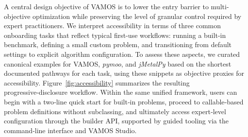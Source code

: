 \documentclass[final,5p,times,twocolumn]{elsarticle}
\newcommand{\VAMOS}{VAMOS}
\begin{document}
A central design objective of \VAMOS{} is to lower the entry barrier to multi-objective optimization while preserving the level of granular control required by expert practitioners. We interpret accessibility in terms of three common onboarding tasks that reflect typical first-use workflows: running a built‑in benchmark, defining a small custom problem, and transitioning from default settings to explicit algorithm configuration. To assess these aspects, we curated canonical examples for \VAMOS{}, \textit{pymoo}, and \textit{jMetalPy} based on the shortest documented pathways for each task, using these snippets as objective proxies for accessibility. Figure~\ref{fig:accessibility} summarizes the resulting progressive‑disclosure workflow. Within the same unified framework, users can begin with a two‑line quick start for built‑in problems, proceed to callable‑based problem definitions without subclassing, and ultimately access expert‑level configuration through the builder API, supported by guided tooling via the command‑line interface and \VAMOS{} Studio.

\end{document}
